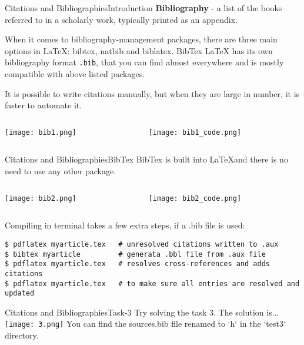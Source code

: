 \begin{frame}{Citations and Bibliographies}{Introduction}
\textbf{Bibliography} - a list of the books referred to in a scholarly work,
typically printed as an appendix.  \\ \vspace{1em}

\footnotesize
When it comes to bibliography-management packages, there are three main options
in LaTeX: bibtex, natbib and biblatex. BibTex LaTeX has its own bibliography format
\texttt{.bib}, that you can find almost everywhere and is mostly compatible
with above listed packages.

It is possible to write citations manually, but when they are large in number,
it is faster to automate it. \vspace{2em}

\begin{columns}
    \begin{column}{0.4\textwidth}
        \texttt{[image: bib1.png]}
    \end{column}
    \begin{column}{0.6\textwidth}
        \texttt{[image: bib1\_code.png]}
    \end{column}
\end{columns}
\end{frame}


\begin{frame}[fragile]{Citations and Bibliographies}{BibTex}
\footnotesize
BibTex is built into \LaTeX and there is no need to use any other package.
\vspace{1em}

\begin{columns}
    \begin{column}{0.3\textwidth}
        \texttt{[image: bib2.png]}
    \end{column}
    \begin{column}{0.7\textwidth}
        \texttt{[image: bib2\_code.png]}
    \end{column}
\end{columns}

Compiling in terminal takes a few extra steps, if a .bib file is used:
\tiny
\begin{lstlisting}
$ pdflatex myarticle.tex   # unresolved citations written to .aux
$ bibtex myarticle         # generata .bbl file from .aux file
$ pdflatex myarticle.tex   # resolves cross-references and adds citations
$ pdflatex myarticle.tex   # to make sure all entries are resolved and updated
\end{lstlisting}

\end{frame}

\begin{frame}{Citations and Bibliographies}{Task-3}
Try solving the task 3. The solution is...\\ \pause
\vspace{1em}
\texttt{[image: 3.png]}
You can find the sources.bib file renamed to `h` in the `test3`
directory.
\end{frame}
